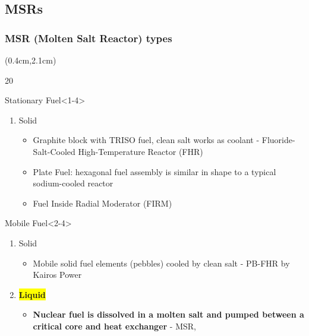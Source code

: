 \subsection{\glspl{MSR}}

\begin{frame}
\frametitle{MSR (Molten Salt Reactor) types}
\begin{textblock*}{12cm}(0.4cm,2.1cm) %
	\begin{overlayarea}{\linewidth}{20\baselineskip}
		\begin{block}{Stationary Fuel}<1-4>
			\begin{enumerate}
				\item Solid
				\begin{itemize}
					\item Graphite block with TRISO fuel, clean salt works as 
					coolant - Fluoride-Salt-Cooled High-Temperature Reactor 
					(FHR)
					\item Plate Fuel: hexagonal fuel assembly is similar in 
					shape 
					to a typical sodium-cooled reactor
					\item Fuel Inside Radial Moderator (FIRM)
				\end{itemize}
			\end{enumerate}
		\end{block}
		
		\begin{block}{Mobile Fuel}<2-4>
			\begin{enumerate}
				\item Solid
				\begin{itemize}
					\item<2-> Mobile solid fuel elements (pebbles) cooled by 
					clean salt - PB-FHR by Kairos Power
				\end{itemize}
				\item<3-> \colorbox{yellow}{\textbf{Liquid}}
				\begin{itemize}
					\item<3-> \textbf{Nuclear fuel is dissolved in a molten 
					salt and pumped between a critical core and heat 
					exchanger} -  MSR, 
				\end{itemize}
			\end{enumerate}
		\end{block}
	\end{overlayarea}
\end{textblock*}
\end{frame}

